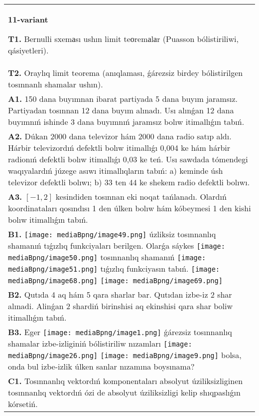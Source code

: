 \documentclass{article}
\begin{document}
\begin{tabular}{m{17cm}}
\textbf{11-variant}
\newline

\textbf{T1.} Bernulli sxemаsı ushın limit teоremаlаr (Puasson bólistiriliwi, qásiyetleri).
 \\
\textbf{T2.} Oraylıq limit teorema (anıqlaması, ǵárezsiz birdey bólistirilgen tosınnanlı shamalar ushın).
 \\
\textbf{A1.} 150 dana buyımnan ibarat partiyada 5 dana buyım jaramsız. Partiyadan tosınnan 12 dana buyım alınadı. Usı alınǵan 12 dana buyımnıń ishinde 3 dana buyımnıń jaramsız bolıw itimallıǵın tabıń. 
 \\
\textbf{A2.} Dúkan 2000 dana televizor hám 2000 dana radio satıp aldı. Hárbir televizordıń defektli bolıw itimallıǵı 0,004 ke hám hárbir radionıń defektli bolıw itimallıǵı 0,03 ke teń. Usı sawdada tómendegi waqıyalardıń júzege asıwı itimallıqların tabıń: a) keminde úsh televizor defektli bolıwı; b) 33 ten 44 ke shekem radio defektli bolıwı.
 \\
\textbf{A3.} $\left[ -1,2 \right]$ kesindiden tosınnan eki noqat tańlanadı. Olardıń koordinataları qosındısı 1 den úlken bolıw hám kóbeymesi 1 den kishi bolıw itimallıǵın tabıń.
 \\
\textbf{B1.} \texttt{[image: mediaBpng/image49.png]} úzliksiz tosınnanlıq shamanıń tıǵızlıq funkciyaları berilgen. Olarǵa sáykes \texttt{[image: mediaBpng/image50.png]} tosınnanlıq shamanıń \texttt{[image: mediaBpng/image51.png]} tıǵızlıq funkciyasın tabıń. \texttt{[image: mediaBpng/image68.png]} \texttt{[image: mediaBpng/image69.png]}
 \\
\textbf{B2.} Qutıda 4 aq hám 5 qara sharlar bar. Qutıdan izbe-iz 2 shar alınadi. Alinǵan 2 shardiń birinshisi aq ekinshisi qara shar boliw itimallıǵın tabıń.
 \\
\textbf{B3.} Eger \texttt{[image: mediaBpng/image1.png]} ǵárezsiz tosınnanlıq shamalar izbe-izliginiń bólistiriliw nızamları
\texttt{[image: mediaBpng/image26.png]} \texttt{[image: mediaBpng/image9.png]}
bolsa, onda bul izbe-izlik úlken sanlar nızamına boysınama?
 \\
\textbf{C1.} Tosınnanlıq vektordıń komponentaları absolyut úziliksizliginen tosınnanlıq vektordıń ózi de absolyut úziliksizligi kelip shıqpaslıǵın kórsetiń.

\end{tabular}
\end{document}
